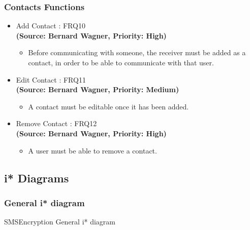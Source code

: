 \subsubsection{Contacts Functions}
\begin{itemize}
\item{Add Contact : FRQ10}\\
\textbf{(Source: Bernard Wagner, Priority: High)}
\begin{itemize}
\item Before communicating with someone, the receiver must be added as a contact, in order to be able to communicate with that user.
\end{itemize}
\item{Edit Contact : FRQ11}\\
\textbf{(Source: Bernard Wagner, Priority: Medium)}
\begin{itemize}
\item A contact must be editable once it has been added.
\end{itemize}
\item{Remove Contact : FRQ12}\\
\textbf{(Source: Bernard Wagner, Priority: High)}
\begin{itemize}
\item A user must be able to remove a contact.
\end{itemize}
\end{itemize}

\subsection{i* Diagrams}
\subsubsection{General i* diagram}
SMSEncryption General i* diagram

